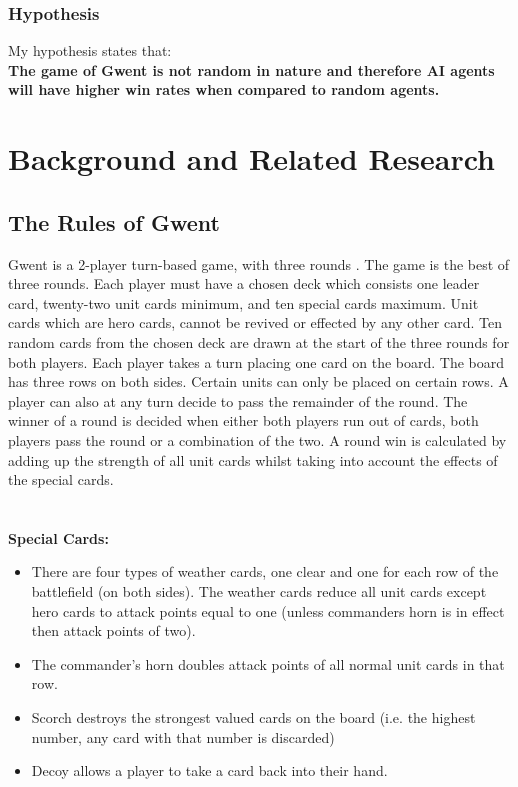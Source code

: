 \documentclass[journal]{IEEEtran}
\begin{document}
  \subsubsection{Hypothesis}
  My hypothesis states that:\\
  \indent\textbf{The game of Gwent is not random in nature and therefore AI agents will have higher win rates when compared to random agents.}
  
  \section{Background and Related Research}
  \label{background}

  \subsection{The Rules of Gwent}
  Gwent is a 2-player turn-based game, with three rounds \cite{guide}. The game is the best of three rounds. Each player must have a chosen deck which consists one leader card, twenty-two unit cards minimum, and ten special cards maximum. Unit cards which are hero cards, cannot be revived or effected by any other card. Ten random cards from the chosen deck are drawn at the start of the three rounds for both players. Each player takes a turn placing one card on the board. The board has three rows on both sides. Certain units can only be placed on certain rows. A player can also at any turn decide to pass the remainder of the round. The winner of a round is decided when either both players run out of cards, both players pass the round or a combination of the two. A round win is calculated by adding up the strength of all unit cards whilst taking into account the effects of the special cards.
  \\\\\\
  \noindent \textbf{Special Cards:}
  
  \begin{itemize}
    \item There are four types of weather cards, one clear and one for each row of the battlefield (on both sides). The weather cards reduce all unit cards except hero cards to attack points equal to one (unless commanders horn is in effect then attack points of two).
    \item The commander's horn doubles attack points of all normal unit cards in that row.
    \item Scorch destroys the strongest valued cards on the board (i.e. the highest number, any card with that number is discarded)
    \item Decoy allows a player to take a card back into their hand.
  \end{itemize}
  
\end{document}
